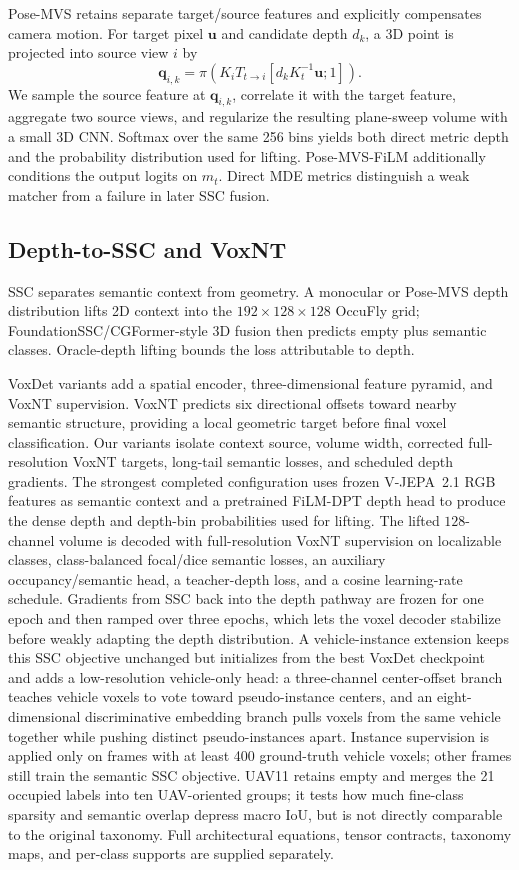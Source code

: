 Pose-MVS retains separate target/source features and explicitly compensates camera motion. For target pixel $\mathbf u$ and candidate depth $d_k$, a 3D point is projected into source view $i$ by
\begin{equation}
 \mathbf q_{i,k}=\pi\left(K_iT_{t\rightarrow i}[d_kK_t^{-1}\mathbf u;1]\right).
 \label{eq:mvs_projection}
\end{equation}
We sample the source feature at $\mathbf q_{i,k}$, correlate it with the target feature, aggregate two source views, and regularize the resulting plane-sweep volume with a small 3D CNN. Softmax over the same 256 bins yields both direct metric depth and the probability distribution used for lifting. Pose-MVS-FiLM additionally conditions the output logits on $m_t$. Direct MDE metrics distinguish a weak matcher from a failure in later SSC fusion.

\subsection{Depth-to-SSC and VoxNT}
SSC separates semantic context from geometry. A monocular or Pose-MVS depth distribution lifts 2D context into the $192\times128\times128$ OccuFly grid; FoundationSSC/CGFormer-style 3D fusion then predicts empty plus semantic classes. Oracle-depth lifting bounds the loss attributable to depth.

VoxDet variants add a spatial encoder, three-dimensional feature pyramid, and VoxNT supervision. VoxNT predicts six directional offsets toward nearby semantic structure, providing a local geometric target before final voxel classification. Our variants isolate context source, volume width, corrected full-resolution VoxNT targets, long-tail semantic losses, and scheduled depth gradients. The strongest completed configuration uses frozen V-JEPA~2.1 RGB features as semantic context and a pretrained FiLM-DPT depth head to produce the dense depth and depth-bin probabilities used for lifting. The lifted $128$-channel volume is decoded with full-resolution VoxNT supervision on localizable classes, class-balanced focal/dice semantic losses, an auxiliary occupancy/semantic head, a teacher-depth loss, and a cosine learning-rate schedule. Gradients from SSC back into the depth pathway are frozen for one epoch and then ramped over three epochs, which lets the voxel decoder stabilize before weakly adapting the depth distribution. A vehicle-instance extension keeps this SSC objective unchanged but initializes from the best VoxDet checkpoint and adds a low-resolution vehicle-only head: a three-channel center-offset branch teaches vehicle voxels to vote toward pseudo-instance centers, and an eight-dimensional discriminative embedding branch pulls voxels from the same vehicle together while pushing distinct pseudo-instances apart. Instance supervision is applied only on frames with at least 400 ground-truth vehicle voxels; other frames still train the semantic SSC objective. UAV11 retains empty and merges the 21 occupied labels into ten UAV-oriented groups; it tests how much fine-class sparsity and semantic overlap depress macro IoU, but is not directly comparable to the original taxonomy. Full architectural equations, tensor contracts, taxonomy maps, and per-class supports are supplied separately.
